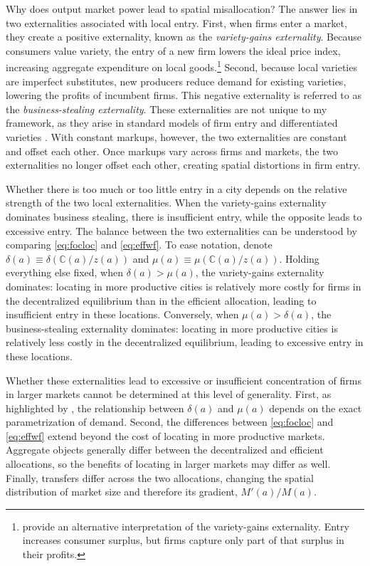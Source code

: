 Why does output market power lead to spatial misallocation? The answer lies in two externalities associated with local entry. First, when firms enter a market, they create a positive externality, known as the \textit{variety-gains externality}. Because consumers value variety, the entry of a new firm lowers the ideal price index, increasing aggregate expenditure on local goods.\footnote{\textcite{Mankiw&Whinston86} provide an alternative interpretation of the variety-gains externality. Entry increases consumer surplus, but firms capture only part of that surplus in their profits.} Second, because local varieties are imperfect substitutes, new producers reduce demand for existing varieties, lowering the profits of incumbent firms. This negative externality is referred to as the \textit{business-stealing externality}. These externalities are not unique to my framework, as they arise in standard models of firm entry and differentiated varieties \parencite{Dixit&Stiglitz77}. With constant markups, however, the two externalities are constant and offset each other. Once markups vary across firms and markets, the two externalities no longer offset each other, creating spatial distortions in firm entry.

Whether there is too much or too little entry in a city depends on the relative strength of the two local externalities. When the variety-gains externality dominates business stealing, there is insufficient entry, while the opposite leads to excessive entry. The balance between the two externalities can be understood by comparing \eqref{eq:focloc} and \eqref{eq:effwf}. To ease notation, denote $\delta(a) \equiv \delta\left(\mathbb{C}(a)/z(a)\right)$ and $\mu(a) \equiv \mu\left(\mathbb{C}(a)/z(a)\right)$. Holding everything else fixed, when $\delta(a) > \mu(a)$, the variety-gains externality dominates: locating in more productive cities is relatively more costly for firms in the decentralized equilibrium than in the efficient allocation, leading to insufficient entry in these locations. Conversely, when $\mu(a) > \delta(a)$, the business-stealing externality dominates: locating in more productive cities is relatively less costly in the decentralized equilibrium, leading to excessive entry in these locations.

Whether these externalities lead to excessive or insufficient concentration of firms in larger markets cannot be determined at this level of generality. First, as highlighted by \textcite{Dhingra&Morrow19}, the relationship between $\delta(a)$ and $\mu(a)$ depends on the exact parametrization of demand. Second, the differences between \eqref{eq:focloc} and \eqref{eq:effwf} extend beyond the cost of locating in more productive markets. Aggregate objects generally differ between the decentralized and efficient allocations, so the benefits of locating in larger markets may differ as well. Finally, transfers differ across the two allocations, changing the spatial distribution of market size and therefore its gradient, $M'(a)/M(a)$. 

